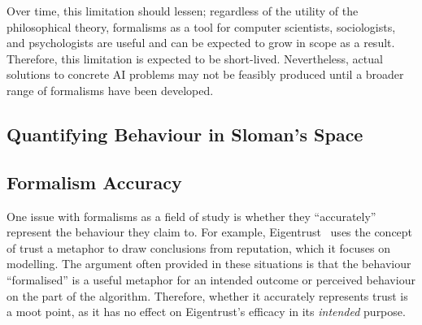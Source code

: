 Over time, this limitation should lessen; regardless of the utility of the philosophical theory, formalisms as a tool for computer scientists, sociologists, and psychologists are useful and can be expected to grow in scope as a result. Therefore, this limitation is expected to be short-lived. Nevertheless, actual solutions to concrete AI problems may not be feasibly produced until a broader range of formalisms have been developed.\par

\subsection{Quantifying Behaviour in Sloman's Space}
% 

\subsection{Formalism Accuracy}
One issue with formalisms as a field of study is whether they ``accurately'' represent the behaviour they claim to. For example, Eigentrust~\citep{eigentrust} uses the concept of trust a metaphor to draw conclusions from reputation, which it focuses on modelling. The argument often provided in these situations is that the behaviour ``formalised'' is a useful metaphor for an intended outcome or perceived behaviour on the part of the algorithm. Therefore, whether it accurately represents trust is a moot point, as it has no effect on Eigentrust's efficacy in its \emph{intended} purpose.\par

